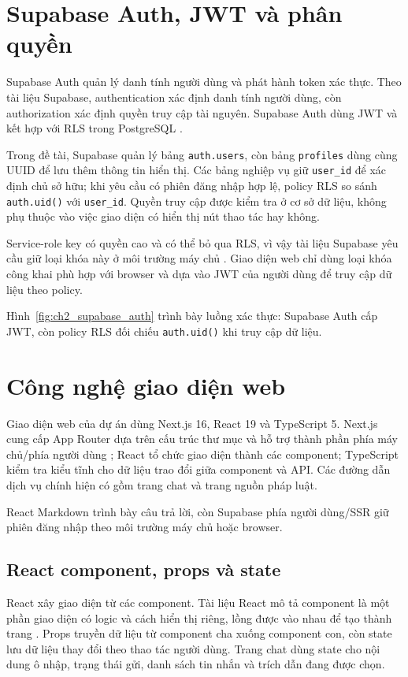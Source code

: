 \documentclass[12pt,a4paper,oneside]{report}
\begin{document}
\section{Supabase Auth, JWT và phân quyền}
Supabase Auth quản lý danh tính người dùng và phát hành token xác thực. Theo tài liệu Supabase, authentication xác định danh tính người dùng, còn authorization xác định quyền truy cập tài nguyên. Supabase Auth dùng JWT và kết hợp với RLS trong PostgreSQL \cite{supabase_auth_docs}.

Trong đề tài, Supabase quản lý bảng \texttt{auth.users}, còn bảng \texttt{profiles} dùng cùng UUID để lưu thêm thông tin hiển thị. Các bảng nghiệp vụ giữ \texttt{user\_id} để xác định chủ sở hữu; khi yêu cầu có phiên đăng nhập hợp lệ, policy RLS so sánh \texttt{auth.uid()} với \texttt{user\_id}. Quyền truy cập được kiểm tra ở cơ sở dữ liệu, không phụ thuộc vào việc giao diện có hiển thị nút thao tác hay không.

Service-role key có quyền cao và có thể bỏ qua RLS, vì vậy tài liệu Supabase yêu cầu giữ loại khóa này ở môi trường máy chủ \cite{supabase_rls_docs}. Giao diện web chỉ dùng loại khóa công khai phù hợp với browser và dựa vào JWT của người dùng để truy cập dữ liệu theo policy.

Hình~\ref{fig:ch2_supabase_auth} trình bày luồng xác thực: Supabase Auth cấp JWT, còn policy RLS đối chiếu \texttt{auth.uid()} khi truy cập dữ liệu.

\section{Công nghệ giao diện web}
Giao diện web của dự án dùng Next.js 16, React 19 và TypeScript 5. Next.js cung cấp App Router dựa trên cấu trúc thư mục và hỗ trợ thành phần phía máy chủ/phía người dùng \cite{nextjs_app_router_docs}; React tổ chức giao diện thành các component; TypeScript kiểm tra kiểu tĩnh cho dữ liệu trao đổi giữa component và API. Các đường dẫn dịch vụ chính hiện có gồm trang chat và trang nguồn pháp luật.

React Markdown trình bày câu trả lời, còn Supabase phía người dùng/SSR giữ phiên đăng nhập theo môi trường máy chủ hoặc browser.


\subsection{React component, props và state}
React xây giao diện từ các component. Tài liệu React mô tả component là một phần giao diện có logic và cách hiển thị riêng, lồng được vào nhau để tạo thành trang \cite{react_docs}. Props truyền dữ liệu từ component cha xuống component con, còn state lưu dữ liệu thay đổi theo thao tác người dùng. Trang chat dùng state cho nội dung ô nhập, trạng thái gửi, danh sách tin nhắn và trích dẫn đang được chọn.
\end{document}
